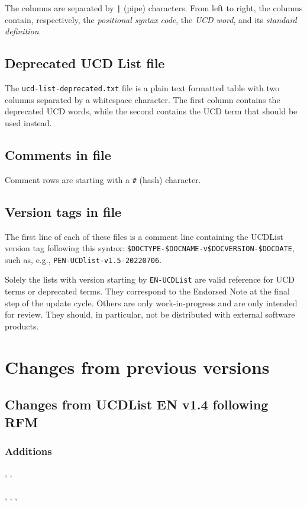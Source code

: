 \documentclass[11pt,a4paper]{ivoa}
\begin{document}
The columns are separated by \texttt{|} (pipe) characters. From left to right, the 
columns contain, respectively, the \emph{positional syntax code}, the \emph{UCD word}, and its
\emph{standard definition}. 

\subsection{Deprecated UCD List file}
The \texttt{ucd-list-deprecated.txt} file is a plain text formatted table with two
columns separated by a whitespace character. The first column contains the deprecated 
UCD words, while the second contains the UCD term that should be used instead.

\subsection{Comments in file}

Comment rows are starting with a \texttt{\#} (hash) character.

\subsection{Version tags in file}

The first line of each of these files is a comment line containing the UCDList version 
tag following this syntax: \texttt{\$DOCTYPE-\$DOCNAME-v\$DOCVERSION-\$DOCDATE}, such as, 
e.g., \texttt{PEN-UCDlist-v1.5-20220706}.

Solely the lists with version starting by \texttt{EN-UCDList} are valid reference for UCD 
terms or deprecated terms. They correspond to the Endorsed Note at the final step of the 
update cycle. Others are only work-in-progress and are only intended
for review.   They should, in particular, not be distributed with
external software products.

\section{Changes from previous versions}
\subsection{Changes from UCDList EN v1.4 following RFM}
\subsubsection*{Additions}
, , \\
 \\
, , ,  \\
\end{document}
